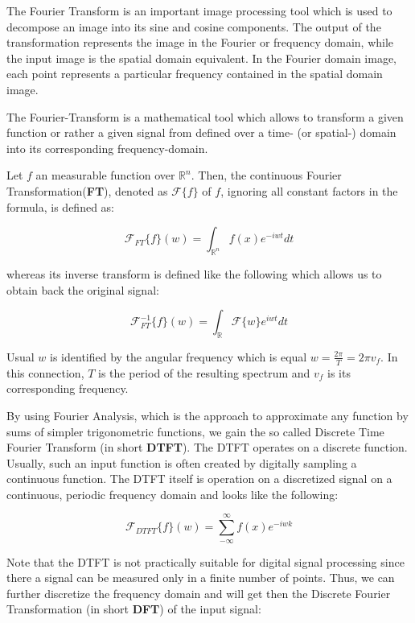The Fourier Transform is an important image processing tool which is used to decompose an image into its sine and cosine components. The output of the transformation represents the image in the Fourier or frequency domain, while the input image is the spatial domain equivalent. In the Fourier domain image, each point represents a particular frequency contained in the spatial domain image. 

The Fourier-Transform is a mathematical tool which allows to transform a given function or rather a given signal from defined over a time- (or spatial-) domain into its corresponding frequency-domain.
 
Let $f$ an measurable function over $\mathds{R}^n$. Then, the continuous Fourier Transformation(\textbf{FT}), denoted as $\mathcal{F}\{f\}$ of $f$, ignoring all constant factors in the formula, is defined as:
 
\begin{equation}
  \mathcal{F}_{FT}\{f\}(w) = \int_{\mathds{R}^n} f(x)e^{-iwt} dt
  \label{eq:cft}
\end{equation}

whereas its inverse transform is defined like the following which allows us to obtain back the original signal:

\begin{equation}
  \mathcal{F}_{FT}^{-1}\{f\}(w) = \int_{\mathds{R}} \mathcal{F}\{w\}e^{iwt} dt
  \label{eq:icft}
\end{equation}

Usual $w$ is identified by the angular frequency which is  equal $w = \frac{2 \pi}{T} = 2 \pi v_f$. In this connection, $T$ is the period of the resulting spectrum and $v_f$ is its corresponding frequency.

By using Fourier Analysis, which is the approach to approximate any function by sums of simpler trigonometric functions, we gain the so called Discrete Time Fourier Transform (in short \textbf{DTFT}). The DTFT operates on a discrete function. Usually, such an input function is often created by digitally sampling a continuous function. The DTFT itself is operation on a discretized signal on a continuous, periodic frequency domain and looks like the following:

\begin{equation}
  \mathcal{F}_{DTFT}\{f\}(w) = \sum_{-\infty}^{\infty} f(x) e^{-iwk}
  \label{eq:dtft}
\end{equation}

Note that the DTFT is not practically suitable for digital signal processing since there a signal can be measured only in a finite number of points. Thus, we can further discretize the frequency domain and will get then the Discrete Fourier Transformation (in short \textbf{DFT}) of the input signal:

